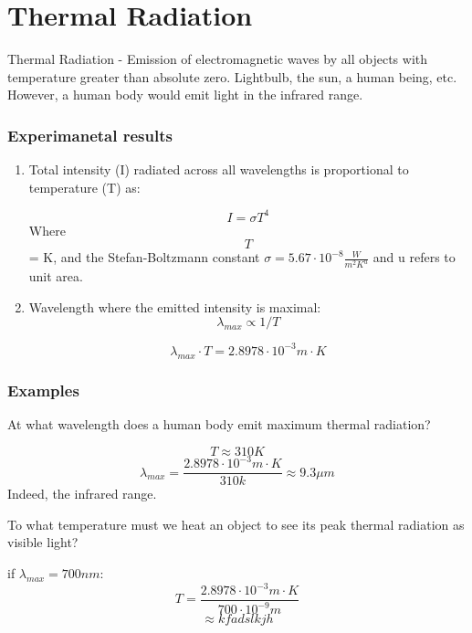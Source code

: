 \documentclass[class=article,crop=false]{standalone}
\begin{document}
\section{Thermal Radiation}

Thermal Radiation - Emission of electromagnetic waves by all objects with temperature greater than absolute zero.
Lightbulb, the sun, a human being, etc. However, a human body would emit light in the infrared range. \\
\subsubsection{Experimanetal results}
\begin{enumerate}
	\item Total intensity (I) radiated across all wavelengths is proportional to temperature (T) as:
		\begin{result}
			$$ I = \sigma T^4 $$
			Where \[T\] = K, and the Stefan-Boltzmann constant $\sigma = 5.67 \cdot 10^{-8} \frac{W}{m^2K^u}$ and u refers to unit area.
		\end{result}
	\item Wavelength where the emitted intensity is maximal:
		$$ \lambda_{max} \propto 1/T $$
		\begin{result}
			$$ \lambda_{max} \cdot T = 2.8978 \cdot 10^{-3} m \cdot K $$
		\end{result}
\end{enumerate}

\subsubsection{Examples}
\newpage
\begin{question}[Example]
	At what wavelength does a human body emit maximum thermal radiation?
	\begin{answer}[Answer]
		$$ T \approx 310 K $$
		$$ \lambda_{max} = \frac{2.8978 \cdot 10^{-3} m \cdot K}{310 k} \approx 9.3 \mu m $$
		Indeed, the infrared range.
	\end{answer}
\end{question}

\begin{question}[Example]
	To what temperature must we heat an object to see its peak thermal radiation as visible light?
	\begin{answer}[Answer]
		if $\lambda_{max} = 700 nm:$\\
		$$ T = \frac{2.8978 \cdot 10^{-3} m \cdot K}{700 \cdot 10^{-9} m} $$
		$$\approx kfadslkjh $$
	\end{answer}
\end{question}
\end{document}
